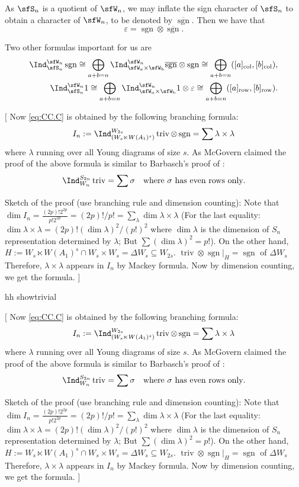 \documentclass[12pt,a4paper]{amsart}
\newcommand{\trivial}[2][]{\if\relax\detokenize{#1}\relax
  {%
      \color{orange} \vspace{0em} $[$  #2 $]$
      \color{black}
  }
  \else
\ifx#1h
\ifcsname showtrivial\endcsname
{%
    \color{orange} \vspace{0em}  $[$ #2 $]$
    \color{black}
}
\fi
\else {\red Wrong argument!} \fi
\fi
}
\def\subset{\subseteq}
\newcommand{\sgn}{\operatorname{sgn}}
\newcommand{\triv}{\operatorname{triv}}
\numberwithin{equation}{section}
\theoremstyle{remark}
\def\Irr{\mathrm{Irr}}
\def\bsgn{\overline{\sgn}}
\begin{document}
As $\sfS_{n}$ is a quotient of $\sfW_{n}$, we may inflate the sign character of $\sfS_{n}$ to obtain a character of $\sfW_{n}$, to be denoted by $\bsgn$. Then we have that
\[\varepsilon = \sgn \otimes \bsgn.\]

Two other formulas important for us are
\begin{equation}\label{eq:indSW}
\begin{split}
\Ind_{\sfS_{n}}^{\sfW_{n}}\sgn \cong\bigoplus_{a+b=n}\Ind_{\sfW_{a}\times \sfW_{\mathrm b}}^{\sfW_{n}} \bsgn\otimes \sgn \cong\bigoplus_{a+b=n} ([a]_{\mathrm{col}},[b]_{\mathrm{col}}), \\
\Ind_{\sfS_{n}}^{\sfW_{n}} 1 \cong \bigoplus_{a+b=n}\Ind_{\sfW_{a}\times \sfW_{\mathrm b}}^{\sfW_{n}} 1 \otimes \varepsilon \cong \bigoplus_{a+b=n} ([a]_{\mathrm{row}},[b]_{\mathrm{row}}).
\end{split}
\end{equation}


\trivial[h]{ %
  Now \eqref{eq:CC.C} is obtained by the following branching formula:
  \cite[p220 (6)]{Mc}
  \[
    I_n:= \Ind_{(W_s\ltimes W(A_1)^s)}^{W_{2s}}\triv\otimes \sgn = \sum \lambda\times \lambda
  \]
  where $\lambda$ running over all Young diagrams of size $s$. As McGovern
  claimed the proof of the above formula is similar to Barbasch's proof of
  \cite[Lemma~4.1]{BV.W}:
  \[
    \Ind_{W_n}^{S_{2n}} \triv = \sum \sigma \quad \text{where $\sigma$ has even
      rows only}.
  \]

  Sketch of the proof (use branching rule and dimension counting): Note that
  $\dim I_n = \frac{(2p)! 2^{2p}}{p! 2^{2p}} = (2p)!/p! =\sum_\lambda \dim \lambda\times \lambda$
  (For the last equality:
  $\dim \lambda\times \lambda = (2p)! (\dim \lambda)^2/(p!)^2$ where
  $\dim \lambda$ is the dimension of $S_n$ representation determined by
  $\lambda$; But $\sum (\dim \lambda)^2 = p!$). On the other hand,
  $H :=W_s\ltimes W(A_1)^s\cap W_s\times W_s = \Delta W_s \subset W_{2s}$.
  $\triv \otimes \sgn|_H = \sgn$ of $\Delta W_s$ Therefore,
  $\lambda\times \lambda$ appears in $I_n$ by Mackey formula. Now by dimension
  counting, we get the formula. }
\end{document}
